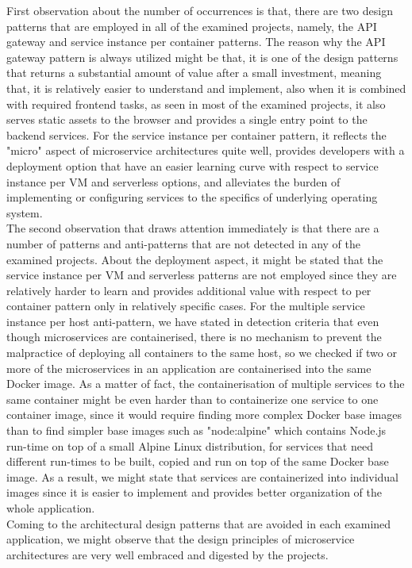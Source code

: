 \documentclass{Configuration_Files/PoliMi3i_thesis}
\begin{document}
First observation about the number of occurrences is that, there are two design patterns that are employed in all of the examined projects, namely, the API gateway and service instance per container patterns.
The reason why the API gateway pattern is always utilized might be that, it is one of the design patterns that returns a substantial amount of value after a small investment, meaning that, it is relatively easier to understand and implement, also when it is combined with required frontend tasks, as seen in most of the examined projects, it also serves static assets to the browser and provides a single entry point to the backend services.
For the service instance per container pattern, it reflects the "micro" aspect of microservice architectures quite well, provides developers with a deployment option that have an easier learning curve with respect to service instance per VM and serverless options, and alleviates the burden of implementing or configuring services to the specifics of underlying operating system.
\\
The second observation that draws attention immediately is that there are a number of patterns and anti-patterns that are not detected in any of the examined projects.
About the deployment aspect, it might be stated that the service instance per VM and serverless patterns are not employed since they are relatively harder to learn and provides additional value with respect to per container pattern only in relatively specific cases.
For the multiple service instance per host anti-pattern, we have stated in detection criteria that even though microservices are containerised, there is no mechanism to prevent the malpractice of deploying all containers to the same host, so we checked if two or more of the microservices in an application are containerised into the same Docker image.
As a matter of fact, the containerisation of multiple services to the same container might be even harder than to containerize one service to one container image, since it would require finding more complex Docker base images than to find simpler base images such as "node:alpine" which contains Node.js run-time on top of a small Alpine Linux distribution, for services that need different run-times to be built, copied and run on top of the same Docker base image.
As a result, we might state that services are containerized into individual images since it is easier to implement and provides better organization of the whole application.
\\
Coming to the architectural design patterns that are avoided in each examined application, we might observe that the design principles of microservice architectures are very well embraced and digested by the projects.
\end{document}
